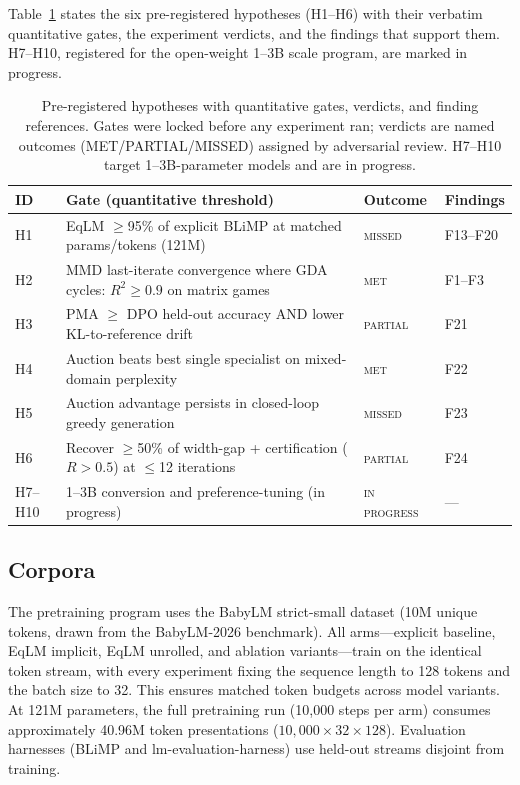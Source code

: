 Table~\ref{tab:hypotheses} states the six pre-registered hypotheses (H1–H6) with their verbatim quantitative gates,
the experiment verdicts, and the findings that support them. H7–H10, registered for the open-weight 1–3B scale program,
are marked in progress.

\begin{table}[H]
\centering
\small
\caption{Pre-registered hypotheses with quantitative gates, verdicts, and finding references. Gates were locked
before any experiment ran; verdicts are named outcomes (MET/PARTIAL/MISSED) assigned by adversarial review. H7–H10
target 1–3B-parameter models and are in progress.}
\label{tab:hypotheses}
\begin{tabular}{@{}p{1.3cm}p{3.8cm}p{2.6cm}p{1.7cm}@{}}
\toprule
\textbf{ID} & \textbf{Gate (quantitative threshold)} & \textbf{Outcome} & \textbf{Findings} \\
\midrule
H1 & EqLM $\geq$95\% of explicit BLiMP at matched params/tokens (121M) & \textsc{missed} & F13–F20 \\
H2 & MMD last-iterate convergence where GDA cycles: $R^2 \geq 0.9$ on matrix games & \textsc{met} & F1–F3 \\
H3 & PMA $\geq$ DPO held-out accuracy AND lower KL-to-reference drift & \textsc{partial} & F21 \\
H4 & Auction beats best single specialist on mixed-domain perplexity & \textsc{met} & F22 \\
H5 & Auction advantage persists in closed-loop greedy generation & \textsc{missed} & F23 \\
H6 & Recover $\geq$50\% of width-gap + certification ($R > 0.5$) at $\leq$12 iterations & \textsc{partial} & F24 \\
H7–H10 & 1–3B conversion and preference-tuning (in progress) & \textsc{in progress} & — \\
\bottomrule
\end{tabular}
\end{table}

\subsection{Corpora}

The pretraining program uses the BabyLM strict-small dataset (10M unique tokens, drawn from the BabyLM-2026
benchmark). All arms—explicit baseline, EqLM implicit, EqLM unrolled, and ablation variants—train on the identical
token stream, with every experiment fixing the sequence length to 128 tokens and the batch size to 32. This ensures
matched token budgets across model variants. At 121M parameters, the full pretraining run (10,000 steps per arm)
consumes approximately 40.96M token presentations ($10{,}000 \times 32 \times 128$). Evaluation harnesses (BLiMP
and lm-evaluation-harness) use held-out streams disjoint from training.

